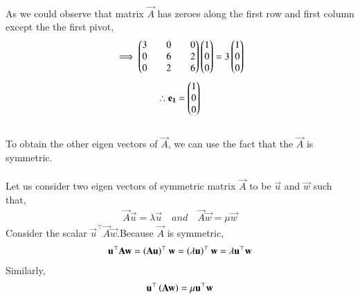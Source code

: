 \documentclass[journal]{IEEEtran}
\begin{document}
\\
As we could observe that matrix $\vec{A}$ has zeroes along the first row and first column except the the first pivot,
\begin{align}
     \implies \begin{pmatrix}3&&0&&0\\0&&6&&2\\0&&2&&6\end{pmatrix}\begin{pmatrix}1\\0\\0\end{pmatrix}=3\begin{pmatrix}1\\0\\0\end{pmatrix}
\end{align}
\begin{align}
    \therefore \mathbf{e_1}=\begin{pmatrix}1\\0\\0\end{pmatrix}
\end{align}
\\
To obtain the other eigen vectors of $\vec{A}$, we can use the fact that the $\vec{A}$ is symmetric.\\
\\
Let us consider two eigen vectors of symmetric matrix $\vec{A}$ to be $\vec{u}$ and $\vec{w}$ such that,
\begin{align}
    \vec{A}\vec{u}=\lambda\vec{u} \quad and \quad \vec{A}\vec{w}=\mu \vec{w}
\end{align}
\newpage
\vspace*{0.25cm}
Consider the scalar $\vec{u}^{\top}\vec{A}\vec{w}$.Because $\vec{A}$ is symmetric,
\begin{align}
    \mathbf{u}^{\top}\mathbf{A}\mathbf{w}=\left(\mathbf{A}\mathbf{u}\right)^{\top}\mathbf{w}=\left(\lambda \mathbf{u}\right)^{\top}\mathbf{w}=\lambda\mathbf{u}^{\top}\mathbf{w}
    \label{eq:2}
\end{align}
Similarly,
\begin{align}
    \mathbf{u}^{\top}\left(\mathbf{A}\mathbf{w}\right)=\mu\mathbf{u}^{\top}\mathbf{w}
    \label{eq:3}
\end{align}
\end{document}
